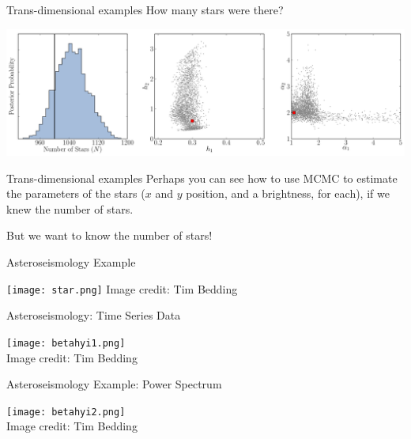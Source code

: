 \begin{frame}[t]{Trans-dimensional examples}
How many stars were there?
\begin{center}
\includegraphics[scale=0.25]{inference2.pdf}
\end{center}

\end{frame}

\begin{frame}[t]{Trans-dimensional examples}
Perhaps you can see how to use MCMC to estimate the parameters of the
stars ($x$ and $y$ position, and a brightness, for each), if we knew the
number of stars.

\vspace{20pt}
But we want to know the number of stars!
\end{frame}

\begin{frame}[t]{Asteroseismology Example}

\begin{center}
\texttt{[image: star.png]}
Image credit: Tim Bedding
\end{center}

\end{frame}

\begin{frame}[t]{Asteroseismology: Time Series Data}

\begin{center}
\texttt{[image: betahyi1.png]}\\
Image credit: Tim Bedding
\end{center}

\end{frame}

\begin{frame}[t]{Asteroseismology Example: Power Spectrum}

\begin{center}
\texttt{[image: betahyi2.png]}\\
Image credit: Tim Bedding
\end{center}

\end{frame}

